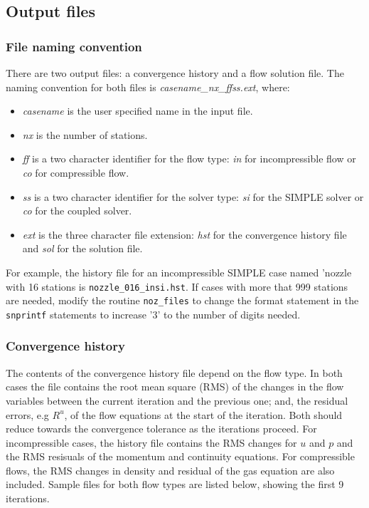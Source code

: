 %
\subsection{Output files}
\label{subsec-ofile}

\subsubsection{File naming convention}
\label{subsubsec-naming}

There are two output files: a convergence history and a flow solution file. 
The naming convention for both files is \textit{casename\_nx\_ffss.ext}, where:
\begin{itemize}
\item \textit{casename} is the user specified name in the input file.
\item \textit{nx} is the number of stations.
\item \textit{ff} is a two character identifier for the flow type: \textit{in} for
      incompressible flow or \textit{co} for compressible flow.
\item \textit{ss} is a two character identifier for the solver type: \textit{si} for
      the SIMPLE solver or \textit{co} for the coupled solver.
\item \textit{ext} is the three character file extension: \textit{hst} for the convergence
      history file and \textit{sol} for the solution file.
\end{itemize}

For example, the history file for an incompressible SIMPLE case named 'nozzle with 16 stations is
{\tt nozzle\_016\_insi.hst}.
If cases with more that 999 stations are needed, modify the routine {\tt noz\_files} to change the
format statement in the {\tt snprintf} statements to increase '3' to the number of digits needed.



\subsubsection{Convergence history}
\label{subsubsec-form-conv}

The contents of the convergence history file depend on the flow type.
In both cases the file contains the root mean square (RMS) of the changes in the flow variables between
the current iteration and the previous one; and, the residual errors, e.g $R^u$, of the flow equations
at the start of the iteration.
Both should reduce towards the convergence tolerance as the iterations proceed.
For incompressible cases, the history file contains the RMS changes for $u$ and $p$ and the RMS resisuals
of the momentum and continuity equations.
For compressible flows, the RMS changes in density and residual of the gas equation are also included.
Sample files for both flow types are listed below, showing the first 9 iterations.

